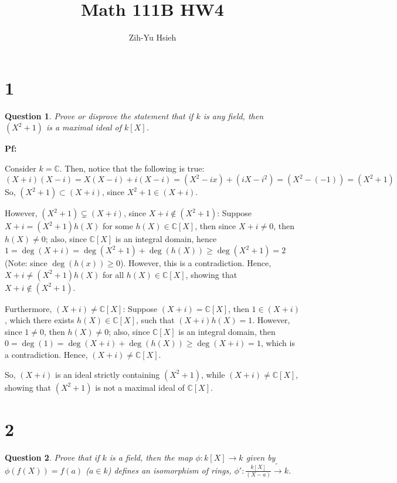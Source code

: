 \documentclass{article}
\title{Math 111B HW4}
\author{Zih-Yu Hsieh}
\newtheorem{question}{Question}
\begin{document}
\maketitle

\section*{1}
\begin{myBox}[]{}
    \begin{question}
        Prove or disprove the statement that if $k$ is any field, then $(X^2+1)$ is a maximal
        ideal of $k[X]$.
    \end{question}
\end{myBox}

\textbf{Pf:}

Consider $k=\mathbb{C}$. Then, notice that the following is true: 
$$(X+i)(X-i)=X(X-i)+i(X-i)=(X^2-ix)+(iX-i^2)=(X^2-(-1))=(X^2+1)$$
So, $(X^2+1)\subset (X+i)$, since $X^2+1\in (X+i)$.

\hfill

However, $(X^2+1)\subsetneq (X+i)$, since $X+i\notin (X^2+1)$:
Suppose $X+i=(X^2+1)h(X)$ for some $h(X)\in \mathbb{C}[X]$, then since $X+i\neq 0$, then $h(X)\neq 0$;
also, since $\mathbb{C}[X]$ is an integral domain, hence $1=\deg(X+i)=\deg(X^2+1)+\deg(h(X)) \geq \deg(X^2+1)=2$ (Note: since $\deg(h(x))\geq 0$).
However, this is a contradiction. Hence, $X+i\neq (X^2+1)h(X)$ for all $h(X)\in \mathbb{C}[X]$, showing that $X+i\notin (X^2+1)$.

\hfill

Furthermore, $(X+i)\neq \mathbb{C}[X]$: Suppose $(X+i)=\mathbb{C}[X]$, then $1\in (X+i)$, which there exists $h(X)\in\mathbb{C}[X]$,
such that $(X+i)h(X)=1$. However, since $1\neq 0$, then $h(X)\neq 0$; also, since $\mathbb{C}[X]$ is an integral domain, then
$0=\deg(1)=\deg(X+i)+\deg(h(X))\geq \deg(X+i)=1$, which is a contradiction. 
Hence, $(X+i)\neq \mathbb{C}[X]$.

\hfill

So, $(X+i)$ is an ideal strictly containing $(X^2+1)$, while $(X+i)\neq \mathbb{C}[X]$, showing that $(X^2+1)$ is not a maximal ideal of $\mathbb{C}[X]$.

\hfill

\hfill

\section*{2}
\begin{myBox}[]{}
    \begin{question}
        Prove that if $k$ is a field, then the map $\phi:k[X]\rightarrow k$ given by $\phi(f(X))=f(a)$ ($a\in k$) defines
        an isomorphism of rings, $\phi':\frac{k[X]}{(X-a)}\tilde\rightarrow k$.
    \end{question}
\end{myBox}
\end{document}
